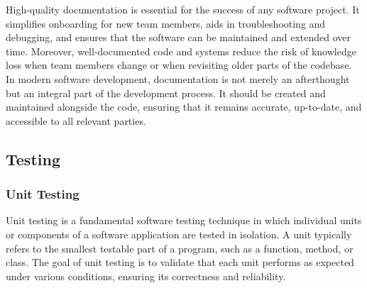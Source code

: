 High-quality documentation is essential for the success of any software project. It simplifies onboarding for new team members, aids in troubleshooting and debugging, and ensures that the software can be maintained and extended over time. Moreover, well-documented code and systems reduce the risk of knowledge loss when team members change or when revisiting older parts of the codebase. \cite{geeksforgeeks:doc} \\

In modern software development, documentation is not merely an afterthought but an integral part of the development process. It should be created and maintained alongside the code, ensuring that it remains accurate, up-to-date, and accessible to all relevant parties.

\subsection{}

\subsection{Testing}

\subsubsection*{Unit Testing}



Unit testing is a fundamental software testing technique in which individual units or components of a software application are tested in isolation. A unit typically refers to the smallest testable part of a program, such as a function, method, or class. The goal of unit testing is to validate that each unit performs as expected under various conditions, ensuring its correctness and reliability. \cite{geeksforgeeks:unit-test} \\

